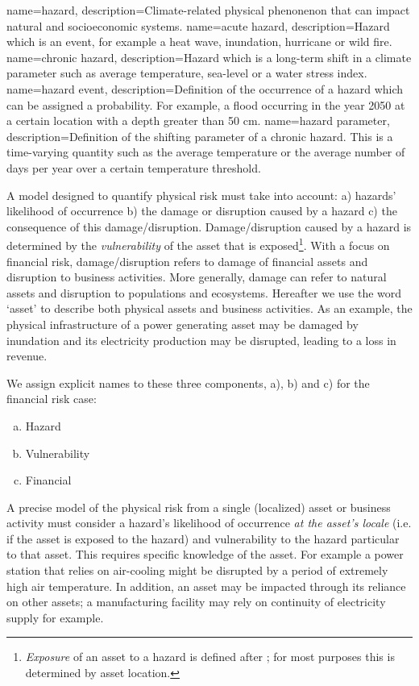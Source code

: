 \documentclass[a4paper,11pt]{extarticle} %
\begin{document}
{
	name=hazard,
	description=Climate-related physical phenonenon that can impact natural and socioeconomic systems.
}
{
	name=acute hazard,
	description={Hazard which is an event, for example a heat wave, inundation, hurricane or wild fire.}
}
{
	name=chronic hazard,
	description={Hazard which is a long-term shift in a climate parameter such as average temperature, sea-level or a water stress index.}  
}
{
	name=hazard event,
	description={Definition of the occurrence of a hazard which can be assigned a probability. For example, a flood occurring in the year 2050 at a certain location with a depth greater than 50 cm.}
}
{
	name=hazard parameter,
	description=Definition of the shifting parameter of a chronic hazard. This is a time-varying quantity such as the average temperature or the average number of days per year over a certain temperature threshold. 
}


A model designed to quantify physical risk must take into account: a) hazards' likelihood of occurrence  b) the damage or disruption caused by a hazard c) the consequence of this damage/disruption. Damage/disruption caused by a hazard is determined by the \emph{vulnerability} of the asset that is exposed\footnote{\emph{Exposure} of an asset to a hazard is defined after \cite{MaskreyEtAl:2011}; for most purposes this is determined by asset location.}. With a focus on financial risk, damage/disruption refers to damage of financial assets and disruption to business activities. More generally, damage can refer to natural assets and disruption to populations and ecosystems. Hereafter we use the word `asset' to describe both physical assets and business activities. As an example, the physical infrastructure of a power generating asset may be damaged by inundation and its electricity production may be disrupted, leading to a loss in revenue. 

We assign explicit names to these three components, a), b) and c) for the financial risk case:
\begin{enumerate}[a)]
\item Hazard
\item Vulnerability
\item Financial
\end{enumerate}

A precise model of the physical risk from a single (localized) asset or business activity must consider a hazard's likelihood of occurrence \emph{at the asset's locale} (i.e. if the asset is exposed to the hazard) and vulnerability to the hazard particular to that asset. This requires specific knowledge of the asset. For example a power station that relies on air-cooling might be disrupted by a period of extremely high air temperature. In addition, an asset may be impacted through its reliance on other assets; a manufacturing facility may rely on continuity of electricity supply for example.
\end{document}
